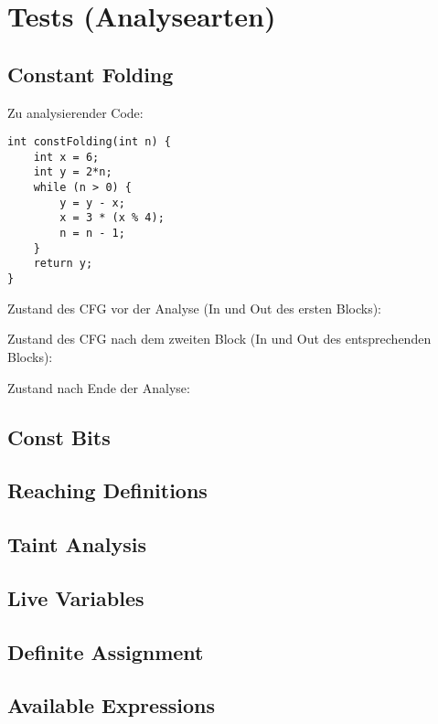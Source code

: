 \section{Tests (Analysearten)}

\subsection{Constant Folding}

Zu analysierender Code: \par

\begin{lstlisting}[frame=single]
int constFolding(int n) {
	int x = 6;
	int y = 2*n;
	while (n > 0) {
		y = y - x;
		x = 3 * (x % 4);
		n = n - 1;
	}
	return y;
}
\end{lstlisting}

Zustand des CFG vor der Analyse (In und Out des ersten Blocks): \par

Zustand des CFG nach dem zweiten Block (In und Out des entsprechenden Blocks): \par

Zustand nach Ende der Analyse: \par

\subsection{Const Bits}

\subsection{Reaching Definitions}

\subsection{Taint Analysis}

\subsection{Live Variables}

\subsection{Definite Assignment}

\subsection{Available Expressions}